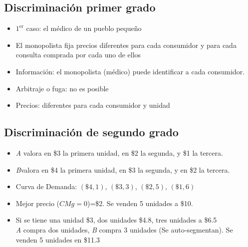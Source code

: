 \subsection{Discriminación primer grado}
\label{ejem:disc_1er_grado}
\begin{itemize}
    \item $1^{\text{er}}$ caso: el médico de un pueblo pequeño
    \item El monopolista fija precios diferentes para cada consumidor y para cada consulta comprada por cada uno de ellos
    \item Información: el monopolista (médico) puede identificar a cada consumidor.
    \item Arbitraje o fuga: no es posible
    \item Precios: diferentes para cada consumidor y unidad
\end{itemize}

\subsection{Discriminación de segundo grado}
\label{ejem:disc_2do_grado}
\begin{itemize}
    \item \textit{A} valora en \$3 la primera unidad, en \$2 la segunda, y \$1 la tercera.
    \item \textit{B}valora en \$4 la primera unidad, en \$3 la segunda, y en \$2 la tercera.
    \item Curva de Demanda: $(\$4, 1)$, $(\$3,3)$, $(\$2,5)$, $(\$1,6)$
    \item Mejor precio ($CMg = 0$)=\$2. Se venden 5 unidades a \$10.
    \item Si se tiene una unidad \$3, dos unidades \$4.8, tres unidades a \$6.5\\
    \textit{A} compra dos unidades, \textit{B} compra 3 unidades (Se auto-segmentan). Se venden 5 unidades en \$11.3
\end{itemize}

\newpage